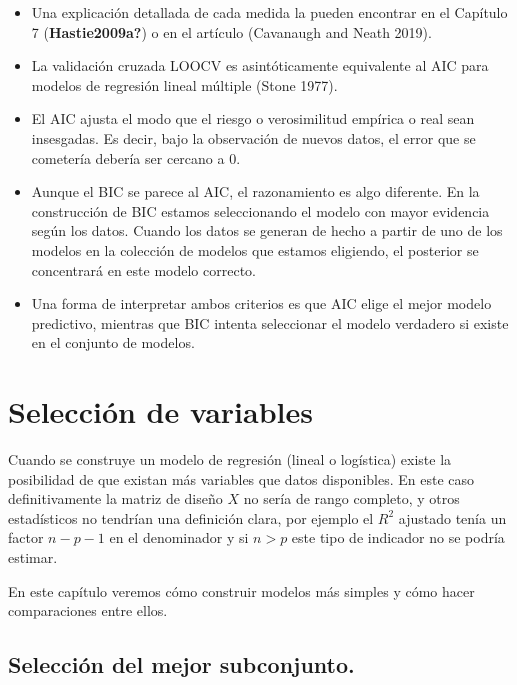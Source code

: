 \documentclass[
  12pt,
]{book}
\providecommand{\tightlist}{%
  \setlength{\itemsep}{0pt}\setlength{\parskip}{0pt}}
\begin{document}
\begin{itemize}
\tightlist
\item
  Una explicación detallada de cada medida la pueden encontrar en el
  Capítulo 7 (\textbf{Hastie2009a?}) o en el artículo (Cavanaugh and
  Neath 2019).
\item
  La validación cruzada LOOCV es asintóticamente equivalente al AIC para
  modelos de regresión lineal múltiple (Stone 1977).
\item
  El AIC ajusta el modo que el riesgo o verosimilitud empírica o real
  sean insesgadas. Es decir, bajo la observación de nuevos datos, el
  error que se cometería debería ser cercano a 0.
\item
  Aunque el BIC se parece al AIC, el razonamiento es algo diferente. En
  la construcción de BIC estamos seleccionando el modelo con mayor
  evidencia según los datos. Cuando los datos se generan de hecho a
  partir de uno de los modelos en la colección de modelos que estamos
  eligiendo, el posterior se concentrará en este modelo correcto.\\
\item
  Una forma de interpretar ambos criterios es que AIC elige el mejor
  modelo predictivo, mientras que BIC intenta seleccionar el modelo
  verdadero si existe en el conjunto de modelos.
\end{itemize}

\hypertarget{selecciuxf3n-de-variables}{%
\section{Selección de variables}\label{selecciuxf3n-de-variables}}

Cuando se construye un modelo de regresión (lineal o logística) existe
la posibilidad de que existan más variables que datos disponibles. En
este caso definitivamente la matriz de diseño \(X\) no sería de rango
completo, y otros estadísticos no tendrían una definición clara, por
ejemplo el \(R^{2}\) ajustado tenía un factor \(n-p-1\) en el
denominador y si \(n>p\) este tipo de indicador no se podría estimar.

En este capítulo veremos cómo construir modelos más simples y cómo hacer
comparaciones entre ellos.

\hypertarget{selecciuxf3n-del-mejor-subconjunto.}{%
\subsection{Selección del mejor
subconjunto.}\label{selecciuxf3n-del-mejor-subconjunto.}}
\end{document}
